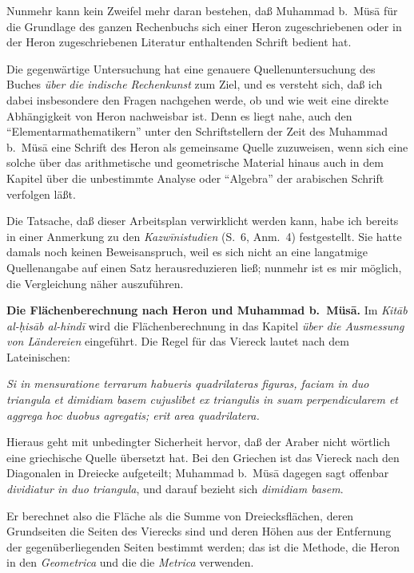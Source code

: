 \documentclass[11pt,a4paper]{article}
\newcommand{\enquote}[1]{``#1''}
\begin{document}
Nunmehr kann kein Zweifel mehr daran bestehen, da\ss{} Muhammad b.\ M\"us\=a f\"ur die Grundlage des ganzen Rechenbuchs sich einer Heron zugeschriebenen oder in der Heron zugeschriebenen Literatur enthaltenden Schrift bedient hat.

Die gegenw\"artige Untersuchung hat eine genauere Quellenuntersuchung des Buches \textit{\"uber die indische Rechenkunst} zum Ziel, und es versteht sich, da\ss{} ich dabei insbesondere den Fragen nachgehen werde, ob und wie weit eine direkte Abh\"angigkeit von Heron nachweisbar ist. Denn es liegt nahe, auch den \enquote{Elementarmathematikern} unter den Schriftstellern der Zeit des Muhammad b.\ M\"us\=a eine Schrift des Heron als gemeinsame Quelle zuzuweisen, wenn sich eine solche \"uber das arithmetische und geometrische Material hinaus auch in dem Kapitel \"uber die unbestimmte Analyse oder \enquote{Algebra} der arabischen Schrift verfolgen l\"a\ss{}t.

Die Tatsache, da\ss{} dieser Arbeitsplan verwirklicht werden kann, habe ich bereits in einer Anmerkung zu den \textit{Kazw\={i}nistudien} (S.\ 6, Anm.\ 4) festgestellt. Sie hatte damals noch keinen Beweisanspruch, weil es sich nicht an eine langatmige Quellenangabe auf einen Satz herausreduzieren lie\ss{}; nunmehr ist es mir m\"oglich, die Vergleichung n\"aher auszuf\"uhren.

\textbf{Die Fl\"achenberechnung nach Heron und Muhammad b.\ M\"us\=a.} Im \textit{Kit\=ab al-\d{h}is\=ab al-hind\=i} wird die Fl\"achenberechnung in das Kapitel \textit{\"uber die Ausmessung von L\"andereien} eingef\"uhrt. Die Regel f\"ur das Viereck lautet nach dem Lateinischen:

\textit{Si in mensuratione terrarum habueris quadrilateras figuras, faciam in duo triangula et dimidiam basem cujuslibet ex triangulis in suam perpendicularem et aggrega hoc duobus agregatis; erit area quadrilatera.}

Hieraus geht mit unbedingter Sicherheit hervor, da\ss{} der Araber nicht w\"ortlich eine griechische Quelle \"ubersetzt hat. Bei den Griechen ist das Viereck nach den Diagonalen in Dreiecke aufgeteilt; Muhammad b.\ M\"us\=a dagegen sagt offenbar \textit{dividiatur in duo triangula}, und darauf bezieht sich \textit{dimidiam basem}.

Er berechnet also die Fl\"ache als die Summe von Dreiecksfl\"achen, deren Grundseiten die Seiten des Vierecks sind und deren H\"ohen aus der Entfernung der gegen\"uberliegenden Seiten bestimmt werden; das ist die Methode, die Heron in den \textit{Geometrica} und die die \textit{Metrica} verwenden.
\end{document}
